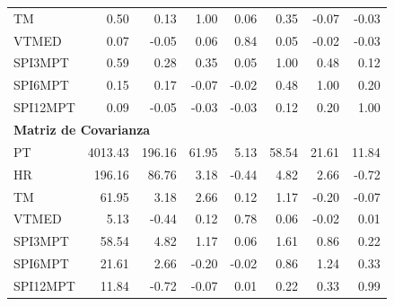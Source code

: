 \begin{table}[ht]
\begin{tabular}{lrrrrrrr}
TM       & 0.50 & 0.13 & 1.00 & 0.06 & 0.35 & -0.07 & -0.03 \\
VTMED    & 0.07 & -0.05 & 0.06 & 0.84 & 0.05 & -0.02 & -0.03 \\
SPI3MPT  & 0.59 & 0.28 & 0.35 & 0.05 & 1.00 & 0.48 & 0.12 \\
SPI6MPT  & 0.15 & 0.17 & -0.07 & -0.02 & 0.48 & 1.00 & 0.20 \\
SPI12MPT & 0.09 & -0.05 & -0.03 & -0.03 & 0.12 & 0.20 & 1.00 \\
\midrule
\multicolumn{8}{l}{\textbf{Matriz de Covarianza}} \\
\midrule
PT       & 4013.43 & 196.16 & 61.95 & 5.13 & 58.54 & 21.61 & 11.84 \\
HR       & 196.16 & 86.76 & 3.18 & -0.44 & 4.82 & 2.66 & -0.72 \\
TM       & 61.95 & 3.18 & 2.66 & 0.12 & 1.17 & -0.20 & -0.07 \\
VTMED    & 5.13 & -0.44 & 0.12 & 0.78 & 0.06 & -0.02 & 0.01 \\
SPI3MPT  & 58.54 & 4.82 & 1.17 & 0.06 & 1.61 & 0.86 & 0.22 \\
SPI6MPT  & 21.61 & 2.66 & -0.20 & -0.02 & 0.86 & 1.24 & 0.33 \\
SPI12MPT & 11.84 & -0.72 & -0.07 & 0.01 & 0.22 & 0.33 & 0.99 \\
\bottomrule
\end{tabular}
\end{table}





